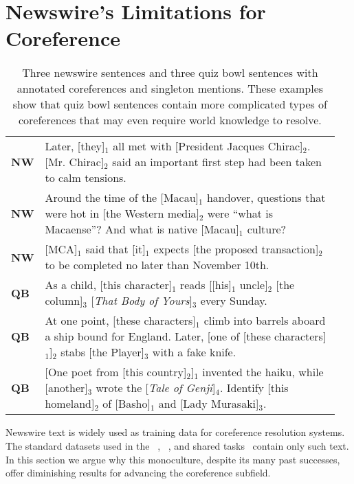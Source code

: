 \section{Newswire's Limitations for Coreference}
\label{sec:newswire-bad}

\begin{table*}
\begin{tabular*}{\linewidth}{p{0.05\linewidth}|p{0.9\linewidth}@{}}
\hline
\textbf{NW} & Later, [they]$_1$ all met with [President Jacques Chirac]$_2$. [Mr. Chirac]$_2$ said an important first step had been taken to calm tensions. \\
\textbf{NW} & Around the time of the [Macau]$_1$ handover, questions that were hot in [the Western media]$_2$ were ``what is Macaense''? And what is native [Macau]$_1$ culture?  \\
\textbf{NW} & [MCA]$_1$ said that [it]$_1$ expects [the proposed transaction]$_2$ to be completed no later than November 10th. \\
\hline
\textbf{QB} & As a child, [this character]$_1$ reads [[his]$_1$ uncle]$_2$ [the column]$_3$ [\emph{That Body of Yours}]$_3$ every Sunday. \\
\textbf{QB} & At one point, [these characters]$_1$ climb into barrels aboard a ship bound for England. Later, [one of [these characters]$_1$]$_2$ stabs [the Player]$_3$ with a fake knife. \\
\textbf{QB} & [One poet from [this country]$_2$]$_1$ invented the haiku, while [another]$_3$ wrote the [\emph{Tale of Genji}]$_4$. Identify [this homeland]$_2$ of [Basho]$_1$ and [Lady Murasaki]$_3$. \\
\hline
\end{tabular*}
\caption{Three newswire sentences and three quiz bowl sentences with annotated coreferences and singleton mentions. These examples show that quiz bowl sentences contain more complicated types of coreferences that may even require world knowledge to resolve.}
\label{table1}
\end{table*}

Newswire text is widely used as training data for coreference
resolution systems. The standard datasets used in the
~\cite{MUC-6,MUC-7},
~\cite{doddington2004automatic}, and \conll{} shared
tasks~\cite{Pradhan:2011:CST:2132936.2132937} contain only such
text. In this section we argue why this monoculture, despite its many
past successes, offer diminishing results for advancing the
coreference subfield.













